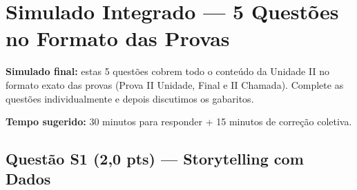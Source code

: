 \section{Simulado Integrado — 5 Questões no Formato das Provas}

\begin{NoteBox}
\textbf{Simulado final:} estas 5 questões cobrem todo o conteúdo da Unidade II no
formato exato das provas (Prova II Unidade, Final e II Chamada). Complete as questões
individualmente e depois discutimos os gabaritos.

\textbf{Tempo sugerido:} 30 minutos para responder + 15 minutos de correção coletiva.
\end{NoteBox}

\subsection*{Questão S1 (2,0 pts) — Storytelling com Dados}

